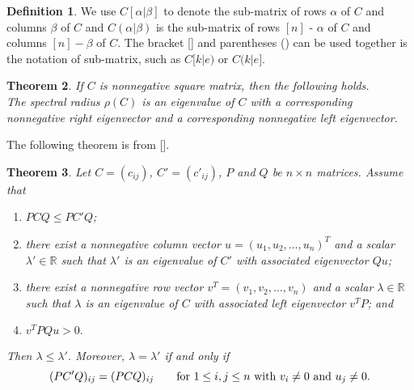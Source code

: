 \documentclass[12pt]{report}%
\theoremstyle{plain}
\newtheorem{thm}{Theorem}[chapter]
\theoremstyle{definition}
\newtheorem{defn}[thm]{Definition}
\begin{document}
    \begin{defn}We use $C[\alpha|\beta]$ to denote the sub-matrix of rows $\alpha$ of $C$ and columns $\beta$ of $C$ and $C(\alpha|\beta)$ is the sub-matrix of rows $[n]$ - $\alpha$ of $C$ and columns $[n] - \beta$ of $C$.
    The bracket [] and parentheses () can be used together is the notation of sub-matrix, such as $C[k|e)$ or $C(k|e]$.
\end{defn}

\begin{thm}
        If $C$ is nonnegative square matrix, then the following holds. \\
        The spectral radius $\rho(C)$ is an eigenvalue of $C$ with a corresponding nonnegative right eigenvector and a corresponding nonnegative left eigenvector.
\end{thm}


The following theorem is from [].

\begin{thm}
 Let $C=(c_{ij})$, $C'=(c'_{ij})$, $P$ and $Q$ be  $n\times n$ matrices.
Assume that
\begin{enumerate}
\item[(i)]    $PCQ\leq PC'Q$;
\item[(ii)]  there exist a nonnegative column vector $u=(u_1, u_2, \ldots, u_n)^T$  and a scalar $\lambda'\in \mathbb{R}$ such that $\lambda'$ is an eigenvalue of $C'$ with associated eigenvector $Qu$;
\item[(iii)] there exist a nonnegative row vector $v^T=(v_1, v_2, \ldots, v_n)$  and a scalar $\lambda\in \mathbb{R}$
such that $\lambda$ is an eigenvalue of $C$ with associated  left eigenvector $v^TP$; and
\item[(iv)] $v^TPQu>0.$
\end{enumerate}
 Then $\lambda\leq \lambda'$.
    Moreover, $\lambda=\lambda'$
if and only if
    \begin{equation*}
        \label{e3}
(PC'Q)_{ij}=(PCQ)_{ij}\qquad \hbox{for~}1\leq i, j\leq n \hbox{~with~} v_i\ne 0 \hbox{~and~} u_j\ne 0.
\end{equation*}
\end{thm}
\end{document}
